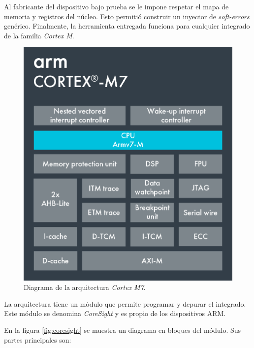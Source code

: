 Al fabricante del dispositivo bajo prueba se le impone respetar el mapa de memoria y registros del núcleo.
Esto permitió construir un inyector de \emph{soft-errors} genérico.
Finalmente, la herramienta entregada funciona para cualquier integrado de la familia \emph{Cortex M}.

\begin{figure}[htbp]
	\centering
	\includegraphics[width=.7\textwidth]{./Figures/Cortex-M7.png}
    \caption{Diagrama de la arquitectura \emph{Cortex M7}\protect\footnotemark.}
	\label{fig:cortexm}
\end{figure}


La arquitectura tiene un módulo que permite programar y depurar el integrado.
Este módulo se denomina \emph{CoreSight} y es propio de los dispositivos ARM.

En la figura \ref{fig:coresight} se muestra un diagrama en bloques del módulo.
Sus partes principales son:


